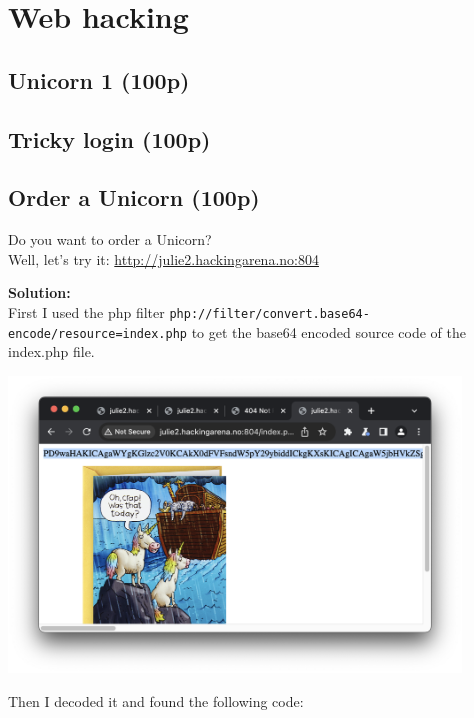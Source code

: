 \section{Web hacking}

\subsection{Unicorn 1 (100p)}
\subsection{Tricky login (100p)}

\newpage
\subsection{Order a Unicorn (100p)}
\addtocounter{points}{100}
Do you want to order a Unicorn?
\\Well, let's try it: \url{http://julie2.hackingarena.no:804}

\textbf{Solution:}\\
First I used the php filter \texttt{php://filter/convert.base64-encode/resource=index.php} to get the base64 encoded source code of the index.php file. 

\begin{center}
    \includegraphics[width=12cm]{img/Web hacking/Order a Unicorn/Screenshot 2023-11-24 at 12.54.35.png}
\end{center}

Then I decoded it and found the following code:

